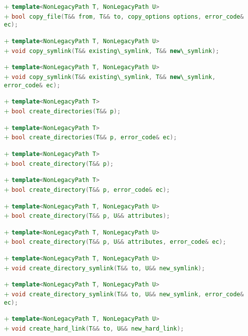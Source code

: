 \documentclass[11pt]{article}
\newcommand{\code}[2][cpp]{\lstinline[language=#1,basicstyle=\small\ttfamily]{#2}}
\newcommand{\tsreplace}[3]{\textcolor{red}{\sout{#1}}#2\textcolor{darkgreen}{#3}}
\begin{document}
\tsreplace{}{}{+ \code{template<NonLegacyPath T, NonLegacyPath U>}}\\
\tsreplace{}{}{+ \code{bool copy_file(T&& from, T&& to, copy_options options, error_code& ec);}}

\tsreplace{}{}{+ \code{template<NonLegacyPath T, NonLegacyPath U>}}\\
\tsreplace{}{}{+ \code{void copy_symlink(T&& existing\_symlink, T&& new\_symlink);}}

\tsreplace{}{}{+ \code{template<NonLegacyPath T, NonLegacyPath U>}}\\
\tsreplace{}{}{+ \code{void copy_symlink(T&& existing\_symlink, T&& new\_symlink, error_code& ec);}}

\tsreplace{}{}{+ \code{template<NonLegacyPath T>}}\\
\tsreplace{}{}{+ \code{bool create_directories(T&& p);}}

\tsreplace{}{}{+ \code{template<NonLegacyPath T>}}\\
\tsreplace{}{}{+ \code{bool create_directories(T&& p, error_code& ec);}}

\tsreplace{}{}{+ \code{template<NonLegacyPath T>}}\\
\tsreplace{}{}{+ \code{bool create_directory(T&& p);}}

\tsreplace{}{}{+ \code{template<NonLegacyPath T>}}\\
\tsreplace{}{}{+ \code{bool create_directory(T&& p, error_code& ec);}}

\tsreplace{}{}{+ \code{template<NonLegacyPath T, NonLegacyPath U>}}\\
\tsreplace{}{}{+ \code{bool create_directory(T&& p, U&& attributes);}}

\tsreplace{}{}{+ \code{template<NonLegacyPath T, NonLegacyPath U>}}\\
\tsreplace{}{}{+ \code{bool create_directory(T&& p, U&& attributes, error_code& ec);}}

\tsreplace{}{}{+ \code{template<NonLegacyPath T, NonLegacyPath U>}}\\
\tsreplace{}{}{+ \code{void create_directory_symlink(T&& to, U&& new_symlink);}}

\tsreplace{}{}{+ \code{template<NonLegacyPath T, NonLegacyPath U>}}\\
\tsreplace{}{}{+ \code{void create_directory_symlink(T&& to, U&& new_symlink, error_code& ec);}}

\tsreplace{}{}{+ \code{template<NonLegacyPath T, NonLegacyPath U>}}\\
\tsreplace{}{}{+ \code{void create_hard_link(T&& to, U&& new_hard_link);}}
\end{document}

